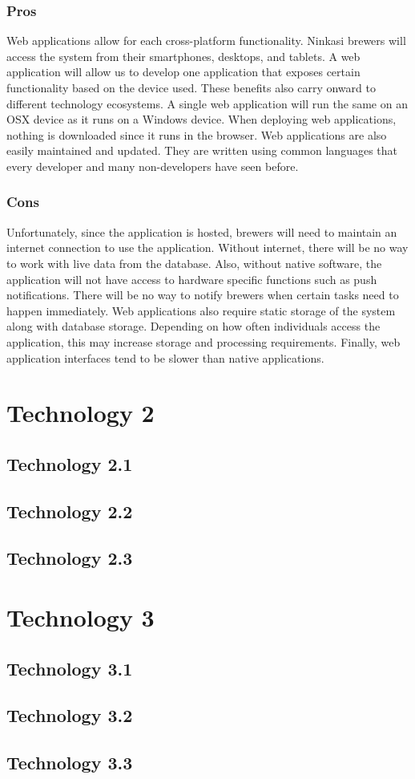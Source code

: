 \documentclass[draftclsnofoot,onecolumn,letterpaper,10pt,compsoc]{IEEEtran}
\begin{document}
        \subsubsection{Pros}
            Web applications allow for each cross-platform functionality.
            Ninkasi brewers will access the system from their smartphones, desktops, and tablets.
            A web application will allow us to develop one application that exposes certain functionality based on the device used.
            These benefits also carry onward to different technology ecosystems.
            A single web application will run the same on an OSX device as it runs on a Windows device.
            When deploying web applications, nothing is downloaded since it runs in the browser.
            Web applications are also easily maintained and updated.
            They are written using common languages that every developer and many non-developers have seen before.
    
        \subsubsection{Cons}
            Unfortunately, since the application is hosted, brewers will need to maintain an internet connection to use the application.
            Without internet, there will be no way to work with live data from the database.
            Also, without native software, the application will not have access to hardware specific functions such as push notifications.
            There will be no way to notify brewers when certain tasks need to happen immediately.
            Web applications also require static storage of the system along with database storage.
            Depending on how often individuals access the application, this may increase storage and processing requirements.
            Finally, web application interfaces tend to be slower than native applications\cite{LifeWireOverview}.


\section{Technology 2}
	\subsection{Technology 2.1}
	\subsection{Technology 2.2}
	\subsection{Technology 2.3}

\section{Technology 3}
	\subsection{Technology 3.1}
	\subsection{Technology 3.2}
	\subsection{Technology 3.3}

{}

\end{document}
